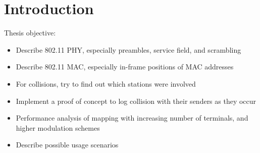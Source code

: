 \chapter{Introduction}\label{ch:introduction}

\glsresetall %


Thesis objective:

\begin{itemize}
	\item Describe 802.11 PHY, especially preambles, service field, and scrambling
	\item Describe 802.11 MAC, especially in-frame positions of MAC addresses
	\item For collisions, try to find out which stations were involved
	\item Implement a proof of concept to log collision with their senders as they occur
	\item Performance analysis of mapping with increasing number of terminals, and higher modulation schemes
	\item Describe possible usage scenarios
\end{itemize}